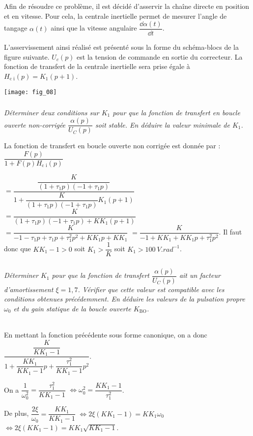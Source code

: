 \begin{multicols}{2}
\ifprof
\else
Afin de résoudre ce problème, il est décidé d'asservir la chaîne directe en position et en vitesse. Pour cela, la centrale inertielle permet de mesurer l'angle de tangage $\alpha (t )$ ainsi que la vitesse angulaire $\dfrac{\dd \alpha(t)}{\dd t}$.

L'asservissement ainsi réalisé est présenté sous la forme du schéma-blocs de la figure suivante.
$U_c (p)$ est la tension de commande en sortie du correcteur. La fonction de transfert de la centrale inertielle
sera prise égale à $H_{\text{c i}}(p)=K_1(p+1)$.

\begin{center}
\texttt{[image: fig\_08]}
\end{center}
\fi


\subparagraph{} \textit{Déterminer deux conditions sur $K_1$ pour que la fonction de transfert en boucle ouverte non-corrigée $\dfrac{\alpha (p)}{U_C(p)}$ soit stable. En déduire la valeur minimale de $K_1$.}
\ifprof
\begin{corrige}
La fonction de transfert en boucle ouverte non corrigée est donnée par : $\dfrac{F(p)}{1+F(p)H_{\text{c i}}(p)}$ 

$=\dfrac{\dfrac{K}{(1+\tau_1p)(-1+ \tau_1p)}}{1+\dfrac{K}{(1+\tau_1p)(-1+ \tau_1p)} K_1(p+1) }$
$=\dfrac{K}{(1+\tau_1p)(-1+ \tau_1p)+K K_1(p+1) }$
$=\dfrac{K}{-1-\tau_1p+\tau_1p + \tau_1^2p^2+K K_1p+K K_1 }$
$=\dfrac{K}{-1+K K_1  +K K_1p + \tau_1^2p^2}$. Il faut donc que $KK_1 -1>0$ soit $K_1 >\dfrac{1}{K}$ soit $K_1>\SI{100}{V.rad^{-1}}$.
\end{corrige}
\else
\fi



\subparagraph{} \textit{Déterminer $K_1$ pour que la fonction de transfert $\dfrac{\alpha (p)}{U_C(p)}$
 ait un facteur d'amortissement $\xi=1,7$.
Vérifier que cette valeur est compatible avec les conditions obtenues précédemment. En déduire les
valeurs de la pulsation propre $\omega_0$ et du gain statique de la boucle ouverte $K_{\text{BO}}$.}
\ifprof
\begin{corrige}~\\

En mettant la fonction précédente sous forme canonique, on a donc $\dfrac{\dfrac{K}{K K_1-1}}{ 1 +\dfrac{K K_1}{K K_1-1}p + \dfrac{\tau_1^2}{K K_1-1}p^2}$.

On a $\dfrac{1}{\omega_0^2}= \dfrac{\tau_1^2}{K K_1-1}$ $\Leftrightarrow {\omega_0^2}= \dfrac{K K_1-1}{\tau_1^2}$. 

De plus, $\dfrac{2\xi}{\omega_0} = \dfrac{K K_1}{K K_1-1}$ $\Leftrightarrow 2\xi \left( K K_1-1 \right) = K K_1 \omega_0$  $\Leftrightarrow 2\xi \left( K K_1-1 \right) = K K_1 \sqrt{K K_1-1}$.


\end{corrige}
\end{multicols}

